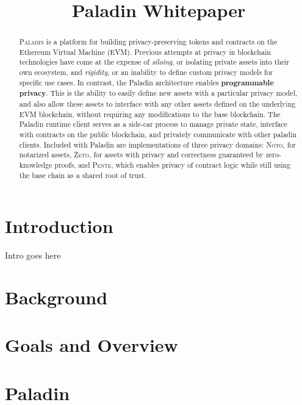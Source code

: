 \documentclass[conference,compsoc,onecolumn]{IEEEtran}
\date{}
\author{}
\begin{document}
\title{Paladin Whitepaper}

\maketitle


\begin{abstract}

\textsc{Paladin} is a platform for building privacy-preserving tokens and contracts on the Ethereum Virtual Machine (EVM). Previous attempts at privacy in blockchain technologies have come at the expense of \textit{siloing}, or isolating private assets into their own ecosystem, and \textit{rigidity}, or an inability to define custom privacy models for specific use cases. In contrast, the Paladin architecture enables \textbf{programmable privacy}. This is the ability to easily define new assets with a particular privacy model, and also allow these assets to interface with any other assets defined on the underlying EVM blockchain, without requiring any modifications to the base blockchain. The Paladin runtime client serves as a side-car process to manage private state, interface with contracts on the public blockchain, and privately communicate with other paladin clients. Included with Paladin are implementations of three privacy domains: \textsc{Noto}, for notarized assets, \textsc{Zeto}, for assets with privacy and correctness guaranteed by zero-knowledge proofs, and \textsc{Pente}, which enables privacy of contract logic while still using the base chain as a shared root of trust.

\end{abstract}

\section{Introduction}

Intro goes here

\section{Background}

\section{Goals and Overview}

\section{Paladin}
\end{document}

